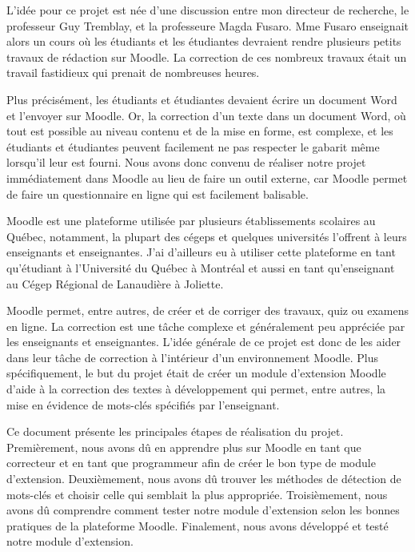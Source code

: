 \begin{introduction}

L'id\'ee pour ce projet est n\'ee d'une discussion entre mon directeur de recherche, le professeur Guy Tremblay, et la professeure Magda Fusaro.
Mme Fusaro enseignait alors un cours o\`u les \'etudiants et les \'etudiantes devraient rendre plusieurs petits travaux de r\'edaction sur Moodle.
La correction de ces nombreux travaux \'etait un travail fastidieux qui prenait de nombreuses heures.

Plus pr\'ecis\'ement, les \'etudiants et \'etudiantes devaient \'ecrire un document Word et l'envoyer sur Moodle.
Or, la correction d'un texte dans un document Word, o\`u tout est possible au niveau contenu et de la mise en forme, est complexe,  et les \'etudiants et \'etudiantes peuvent facilement ne pas respecter le gabarit m\^eme lorsqu'il leur est fourni.
Nous avons donc convenu de r\'ealiser notre projet imm\'ediatement dans Moodle au lieu de faire un outil externe, car Moodle permet de faire un questionnaire en ligne qui est facilement balisable.

Moodle est une plateforme utilisée par plusieurs établissements scolaires au Québec, notamment, la plupart des cégeps et quelques universités l'offrent à leurs enseignants et enseignantes.
J'ai d'ailleurs eu à utiliser cette plateforme en tant qu'étudiant à l'Université du Québec à Montréal et aussi en tant qu'enseignant au Cégep Régional de Lanaudière à Joliette.

Moodle permet, entre autres, de créer et de corriger des travaux, quiz ou examens en ligne.
La correction est une tâche complexe et g\'en\'eralement peu appréciée par les enseignants et enseignantes.
L'idée générale de ce projet est donc de les aider dans leur tâche de correction à l'intérieur d'un environnement Moodle.
Plus sp\'ecifiquement, le but du projet \'etait de créer un module d'extension Moodle d'aide à la correction des textes à développement qui permet, entre autres, la mise en évidence de mots-clés sp\'ecifi\'es par l'enseignant.

Ce document pr\'esente les principales étapes de réalisation du projet.
Premièrement, nous avons d\^u en apprendre plus sur Moodle en tant que correcteur et en tant que programmeur afin de créer le bon type de module d'extension.
Deuxièmement, nous avons d\^u trouver les méthodes de détection de mots-clés et choisir celle qui semblait la plus appropri\'ee.
Troisièmement, nous avons d\^u comprendre comment tester notre module d'extension selon les bonnes pratiques de la plateforme Moodle.
Finalement, nous avons développ\'e et test\'e notre module d'extension.

\end{introduction}
